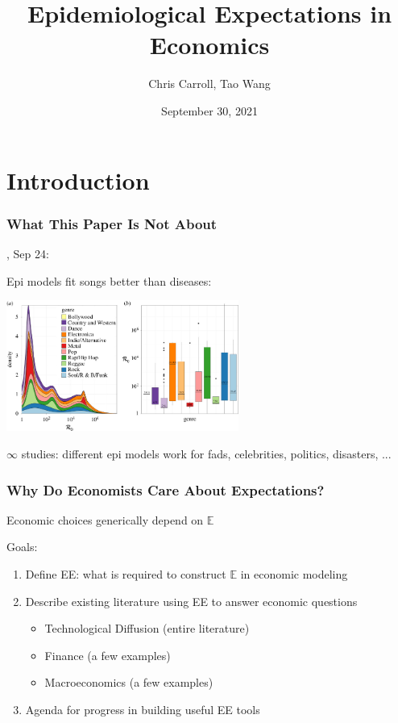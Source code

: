 \documentclass[pdflatex]{beamer}
\title{Epidemiological Expectations in Economics}
\author[Carroll, Wang]{Chris Carroll, Tao Wang}
\institute[JHU]{Johns Hopkins University}
\date{September 30, 2021}
\begin{document}


\begin{frame}[plain]
  \titlepage
\end{frame}

\section{Introduction}

\begin{frame}\frametitle{What This Paper Is Not About}
\pause
\href{https://royalsocietypublishing.org/doi/10.1098/rspa.2021.0457}{\cite{rosati2021modelling}}, Sep 24:

Epi models fit songs better than diseases:

\centerline{\includegraphics[width=3in]{./figures/FigureMusicR0.pdf}}

\pause $\infty$ studies: different epi models work for fads, celebrities, politics, disasters, ...
\end{frame}

\begin{frame}
    \frametitle{Why Do Economists Care About Expectations?}

    \pause Economic choices generically depend on $\mathbb{E}$

\medskip\medskip
\pause Goals:
    \begin{enumerate}
        \item Define EE: what is required to construct $\mathbb{E}$ in economic modeling
        \item Describe existing literature using EE to answer economic questions
        \begin{itemize}
            \item Technological Diffusion (entire literature)
            \item Finance (a few examples)
            \item Macroeconomics (a few examples)
        \end{itemize}
        \item Agenda for progress in building useful EE tools
    \end{enumerate}
\end{frame}
\end{document}
